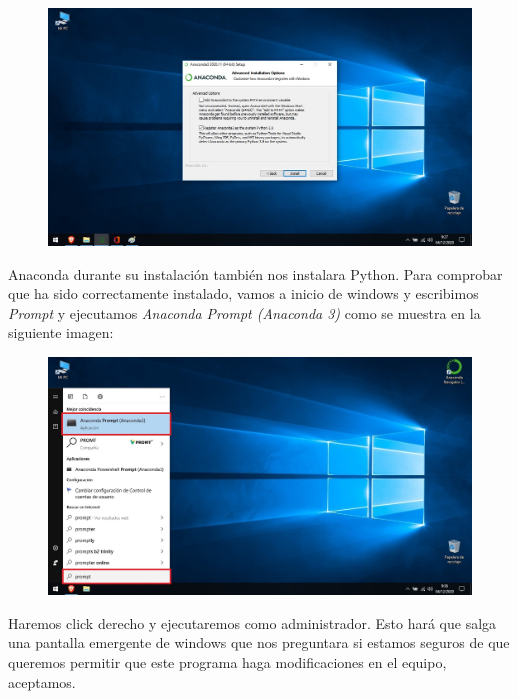 \documentclass[a4paper,10pt]{article}
\begin{document}
\begin{figure}[H]
\begin{center}
\includegraphics[width=450pt]{./fotos/introduccion/0 - Instalacion Anaconda.jpg}
\end{center}
\end{figure}

Anaconda durante su instalación también nos instalara Python. Para comprobar que ha sido correctamente instalado, vamos a inicio de windows y escribimos \textit{Prompt} y ejecutamos \textit{Anaconda Prompt (Anaconda 3)} como se muestra en la siguiente imagen:

\begin{center}
\begin{figure}[H]
\begin{center}
\includegraphics[width=450pt]{./fotos/introduccion/1 - anaconda (V).jpg}
\end{center}
\end{figure}
\vfill
\end{center}

Haremos click derecho y ejecutaremos como administrador. Esto hará que salga una pantalla emergente de windows que nos preguntara si estamos seguros de que queremos permitir que este programa haga modificaciones en el equipo, aceptamos. 
\end{document}
